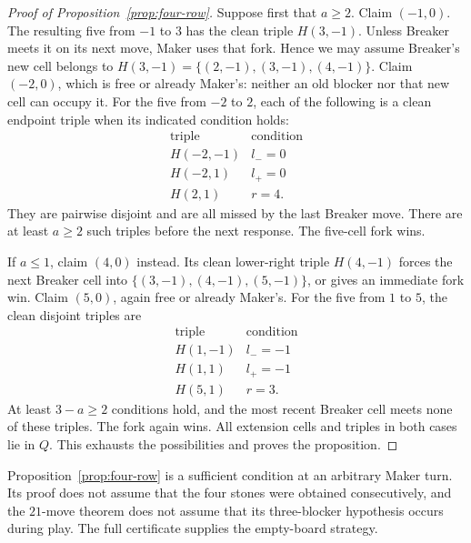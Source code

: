 \begin{proof}[Proof of Proposition~\ref{prop:four-row}]
Suppose first that $a\ge2$. Claim $(-1,0)$.
The resulting five from $-1$ to $3$ has the clean triple
$H(3,-1)$. Unless Breaker meets it on its next move, Maker
uses that fork. Hence we may assume Breaker's new cell belongs
to $H(3,-1)=\{(2,-1),(3,-1),(4,-1)\}$.
Claim $(-2,0)$, which is free or already Maker's: neither an
old blocker nor that new cell can occupy it.
For the five from $-2$ to $2$, each of the following is a clean
endpoint triple when its indicated condition holds:
\[
\begin{array}{c|c}
\text{triple}&\text{condition}\\ \hline
H(-2,-1)&l_-=0\\
H(-2,1)&l_+=0\\
H(2,1)&r=4.
\end{array}
\]
They are pairwise disjoint and are all missed by the last
Breaker move. There are at least $a\ge2$ such triples before
the next response. The five-cell fork wins.

If $a\le1$, claim $(4,0)$ instead. Its clean lower-right triple
$H(4,-1)$ forces the next Breaker cell into
$\{(3,-1),(4,-1),(5,-1)\}$, or gives an immediate fork win.
Claim $(5,0)$, again free or already Maker's.
For the five from $1$ to $5$, the clean disjoint triples are
\[
\begin{array}{c|c}
\text{triple}&\text{condition}\\ \hline
H(1,-1)&l_-=-1\\
H(1,1)&l_+=-1\\
H(5,1)&r=3.
\end{array}
\]
At least $3-a\ge2$ conditions hold, and the most recent Breaker
cell meets none of these triples. The fork again wins.
All extension cells and triples in both cases lie in $Q$.
This exhausts the possibilities and proves the proposition.
\end{proof}

Proposition~\ref{prop:four-row} is a sufficient condition at an
arbitrary Maker turn. Its proof does not assume that the four
stones were obtained consecutively, and the $21$-move theorem
does not assume that its three-blocker hypothesis occurs during
play. The full certificate supplies the empty-board strategy.
